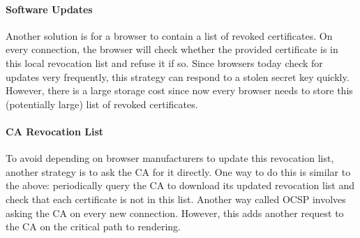 \paragraph{Software Updates}
Another solution is for a browser to contain a list of revoked certificates. On every connection, the browser will check whether the provided certificate is in this local revocation list and refuse it if so. Since browsers today check for updates very frequently, this strategy can respond to a stolen secret key quickly. However, there is a large storage cost since now every browser needs to store this (potentially large) list of revoked certificates.

\paragraph{CA Revocation List}
To avoid depending on browser manufacturers to update this revocation list, another strategy is to ask the CA for it directly. One way to do this is similar to the above: periodically query the CA to download its updated revocation list and check that each certificate is not in this list. Another way called OCSP involves asking the CA on every new connection. However, this adds another request to the CA on the critical path to rendering.
